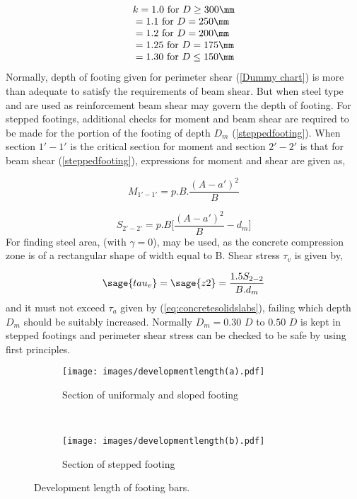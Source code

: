 $$\begin{array}{l@{}l}
&{}k=1.0 \text{ for } D \geq 300 \mm\\
&{}=1.1 \text{ for } D = 250 \mm\\   
&{}=1.2 \text{ for } D = 200 \mm\\
&{}=1.25 \text{ for } D = 175 \mm\\   
&{}=1.30 \text{ for } D \leq 150 \mm
\end{array}$$
Normally, depth of footing given for perimeter shear
(\chartm \ref{Dummy chart}) is more than adequate
to satisfy the requirements of beam shear. But when steel type 
{\fefouronefive} and {\fefivezerozero} are used as reinforcement
beam shear may govern the depth of footing. For stepped footings,
additional checks for moment and beam shear are required to be made for
the portion of the footing of depth $D_m$ (\fig \ref{steppedfooting}).
When section ${1'-1'}$ is the critical section for moment and section
${2'-2'}$ is that for beam shear (\fig \ref{steppedfooting}), 
expressions for moment and shear are given as,

\begin{equation}
         \label{eq:momentandshear1-1}
        M_{1'-1'}=p.B.\frac{(A-a')^2}{B}
\end{equation}

\begin{equation}                                             \label{eq:momentandshear2-2}
        S_{2'-2'}=p.B\bigg[\frac{(A-a')^2}{B}-d_m\bigg]                                 
\end{equation}
For finding steel area,  (with $\gamma = 0$), may be used,
as the concrete compression zone is of a rectangular shape of width equal 
to B. Shear stress $\tau_v$ is given by,

\begin{equation}
        \label{eq:Shearstress}
        \sage{tau_v}=\sage{z2}=\frac{1.5S_{2-2}}{B.d_m}
\end{equation}
and it must not exceed $\tau_a$ given by \eqn (\ref{eq:concretesolidslabs}),
failing which depth $D_m$ should be suitably increased. Normally
$D_m = 0.30$ $D$ to $0.50$ $D$ is kept in stepped footings and perimeter 
shear stress can be checked to be safe by using first principles.

\begin{figure}
  \centering
  \begin{subfigure}[b]{0.5\textwidth}
    \texttt{[image: images/developmentlength(a).pdf]}
    \caption{Section of uniformaly and sloped footing}
    \label{uniformallydeepfooting}
  \end{subfigure}\\
  \begin{subfigure}[b]{0.5\textwidth}
    \texttt{[image: images/developmentlength(b).pdf]}
    \caption{Section of stepped footing}
    \label{stepedfoting}
  \end{subfigure}
\caption{Development length of footing bars.}
\end{figure}

